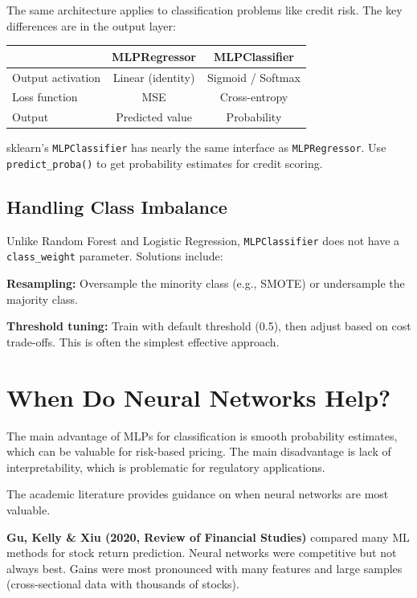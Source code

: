 \documentclass[11pt,a4paper]{article}
\begin{document}
The same architecture applies to classification problems like credit risk. The key differences are in the output layer:

\begin{center}
\begin{tabular}{lcc}
\toprule
& \textbf{MLPRegressor} & \textbf{MLPClassifier} \\
\midrule
Output activation & Linear (identity) & Sigmoid / Softmax \\
Loss function & MSE & Cross-entropy \\
Output & Predicted value & Probability \\
\bottomrule
\end{tabular}
\end{center}

sklearn's \texttt{MLPClassifier} has nearly the same interface as \texttt{MLPRegressor}. Use \texttt{predict\_proba()} to get probability estimates for credit scoring.

\subsection{Handling Class Imbalance}

Unlike Random Forest and Logistic Regression, \texttt{MLPClassifier} does not have a \texttt{class\_weight} parameter. Solutions include:

\textbf{Resampling:} Oversample the minority class (e.g., SMOTE) or undersample the majority class.

\textbf{Threshold tuning:} Train with default threshold (0.5), then adjust based on cost trade-offs. This is often the simplest effective approach.


\section{When Do Neural Networks Help?}
The main advantage of MLPs for classification is smooth probability estimates, which can be valuable for risk-based pricing. The main disadvantage is lack of interpretability, which is problematic for regulatory applications.

The academic literature provides guidance on when neural networks are most valuable.

\textbf{Gu, Kelly \& Xiu (2020, Review of Financial Studies)} compared many ML methods for stock return prediction. Neural networks were competitive but not always best. Gains were most pronounced with many features and large samples (cross-sectional data with thousands of stocks).
\end{document}
